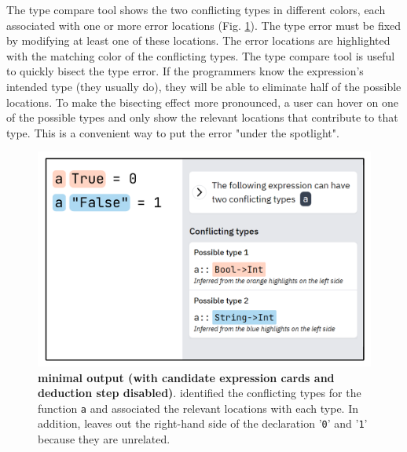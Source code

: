 The type compare tool shows the two conflicting types in different colors, each associated with one or more error locations (Fig. \ref{fig:compare}).  The type error must be fixed by modifying at least one of these locations. The error locations are highlighted with the matching color of the conflicting types. The type compare tool is useful to quickly bisect the type error. If the programmers know the expression's intended type (they usually do), they will be able to eliminate half of the possible locations. To make the bisecting effect more pronounced, a user can hover on one of the possible types and only show the relevant locations that
contribute to that type. This is a convenient way to put the error "under the spotlight".


\begin{figure}[h]
    \centering
    \includegraphics[width=\linewidth]{images/intro-compare.pdf}
    \caption{
        \textbf{\chameleon{} minimal output (with candidate expression cards and deduction step disabled)}. \chameleon{} identified the conflicting types for the function \texttt{a} and associated the relevant locations with each type. In addition, \chameleon{} leaves out the right-hand side of the declaration '\texttt{0}' and '\texttt{1}' because they are unrelated.
}
    \label{fig:compare}
\end{figure}



